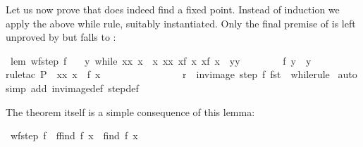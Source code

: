 \begin{isabellebody}
\begin{isamarkuptext}
Let us now prove that  does indeed find a fixed point. Instead
of induction we apply the above while rule, suitably instantiated.
Only the final premise of  is left unproved
by  but falls to :%
\end{isamarkuptext}%
\isamarkuptrue%
\isamarkupfalse%
\ lem{\isacharcolon}\ {\isachardoublequoteopen}wf{\isacharparenleft}step{}\ f{\isacharparenright}\ {\isasymLongrightarrow}\isanewline
\ \ {\isasymexists}y{\isachardot}\ while\ {\isacharparenleft}{\isasymlambda}{\isacharparenleft}x{\isacharcomma}x{\isacharprime}{\isacharparenright}{\isachardot}\ x{\isacharprime}\ {\isasymnoteq}\ x{\isacharparenright}\ {\isacharparenleft}{\isasymlambda}{\isacharparenleft}x{\isacharcomma}x{\isacharprime}{\isacharparenright}{\isachardot}\ {\isacharparenleft}x{\isacharprime}{\isacharcomma}f\ x{\isacharprime}{\isacharparenright}{\isacharparenright}\ {\isacharparenleft}x{\isacharcomma}f\ x{\isacharparenright}\ {\isacharequal}\ {\isacharparenleft}y{\isacharcomma}y{\isacharparenright}\ {\isasymand}\isanewline
\ \ \ \ \ \ \ f\ y\ {\isacharequal}\ y{\isachardoublequoteclose}\isanewline
%
\isadelimproof
%
\endisadelimproof
%
\isatagproof
{}\isamarkupfalse%
{\isacharparenleft}rule{\isacharunderscore}tac\ P\ {\isacharequal}\ {\isachardoublequoteopen}{\isasymlambda}{\isacharparenleft}x{\isacharcomma}x{\isacharprime}{\isacharparenright}{\isachardot}\ x{\isacharprime}\ {\isacharequal}\ f\ x{\isachardoublequoteclose}\ \isanewline
\ \ \ \ \ \ \ \ \ \ \ \ \ \ \ r\ {\isacharequal}\ {\isachardoublequoteopen}inv{\isacharunderscore}image\ {\isacharparenleft}step{}\ f{\isacharparenright}\ fst{\isachardoublequoteclose}\ \ while{\isacharunderscore}rule{\isacharparenright}\isanewline
{}\isamarkupfalse%
\ auto\isanewline
{}\isamarkupfalse%
{\isacharparenleft}simp\ add{\isacharcolon}\ inv{\isacharunderscore}image{\isacharunderscore}def\ step{}{\isacharunderscore}def{\isacharparenright}\isanewline
{}\isamarkupfalse%
%
\endisatagproof
{\isafoldproof}%
%
\isadelimproof
%
\endisadelimproof
%
\begin{isamarkuptext}%
The theorem itself is a simple consequence of this lemma:%
\end{isamarkuptext}%
\isamarkuptrue%
\isamarkupfalse%
\ {\isachardoublequoteopen}wf{\isacharparenleft}step{}\ f{\isacharparenright}\ {\isasymLongrightarrow}\ f{\isacharparenleft}find{}\ f\ x{\isacharparenright}\ {\isacharequal}\ find{}\ f\ x{\isachardoublequoteclose}\isanewline

\end{isabellebody}
